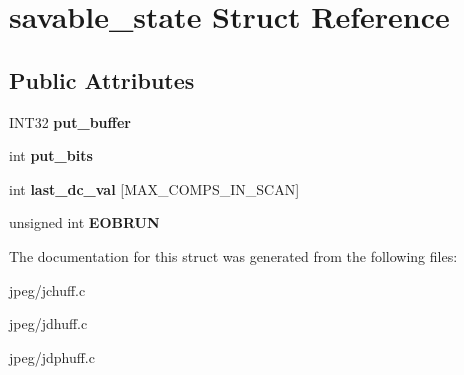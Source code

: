\hypertarget{structsavable__state}{}\section{savable\+\_\+state Struct Reference}
\label{structsavable__state}
\subsection*{Public Attributes}
\begin{DoxyCompactItemize}
\item 
I\+N\+T32 {\bfseries put\+\_\+buffer}\hypertarget{structsavable__state_a71fdab6bc3ab791e85f61179045da4dd}{}\label{structsavable__state_a71fdab6bc3ab791e85f61179045da4dd}

\item 
int {\bfseries put\+\_\+bits}\hypertarget{structsavable__state_a767d7a21d1bd5bee01108b947bfc9fbf}{}\label{structsavable__state_a767d7a21d1bd5bee01108b947bfc9fbf}

\item 
int {\bfseries last\+\_\+dc\+\_\+val} \mbox{[}M\+A\+X\+\_\+\+C\+O\+M\+P\+S\+\_\+\+I\+N\+\_\+\+S\+C\+AN\mbox{]}\hypertarget{structsavable__state_a828b78727611f4ff5353d24cf7230d85}{}\label{structsavable__state_a828b78727611f4ff5353d24cf7230d85}

\item 
unsigned int {\bfseries E\+O\+B\+R\+UN}\hypertarget{structsavable__state_a23c64b6c9ba0c84041e1a0533c2312cb}{}\label{structsavable__state_a23c64b6c9ba0c84041e1a0533c2312cb}

\end{DoxyCompactItemize}


The documentation for this struct was generated from the following files\+:\begin{DoxyCompactItemize}
\item 
jpeg/jchuff.\+c\item 
jpeg/jdhuff.\+c\item 
jpeg/jdphuff.\+c\end{DoxyCompactItemize}
